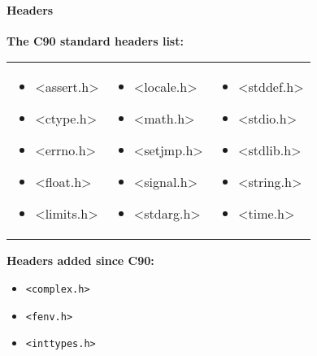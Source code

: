 \paragraph{Headers}
\textbf{The C90 standard headers list:}

\begin{tabular}{p{2.3cm} p{2.3cm} p{2.3cm}}
\begin{itemize}
\setlength{\itemsep}{0cm}
\setlength{\parskip}{0cm}
	\item \textless{}assert.h\textgreater{}
	\item \textless{}ctype.h\textgreater{}
	\item \textless{}errno.h\textgreater{}
	\item \textless{}float.h\textgreater{}
	\item \textless{}limits.h\textgreater{}
\end{itemize}
&
\begin{itemize}
\setlength{\itemsep}{0cm}
\setlength{\parskip}{0cm}
	\item \textless{}locale.h\textgreater{}
	\item \textless{}math.h\textgreater{}
	\item \textless{}setjmp.h\textgreater{}
	\item \textless{}signal.h\textgreater{}
	\item \textless{}stdarg.h\textgreater{}
\end{itemize}
&
\begin{itemize}
\setlength{\itemsep}{0cm}
\setlength{\parskip}{0cm}
	\item \textless{}stddef.h\textgreater{}
	\item \textless{}stdio.h\textgreater{}
	\item \textless{}stdlib.h\textgreater{}
	\item \textless{}string.h\textgreater{}
	\item \textless{}time.h\textgreater{}
\end{itemize}
\end{tabular}

\textbf{Headers added since C90:}
\begin{itemize}
\setlength{\itemsep}{0cm}
\setlength{\parskip}{0cm}
	\item \texttt{\textless{}complex.h\textgreater{}}
	\item \texttt{\textless{}fenv.h\textgreater{}}
	\item \texttt{\textless{}inttypes.h\textgreater{}}
\end{itemize}


